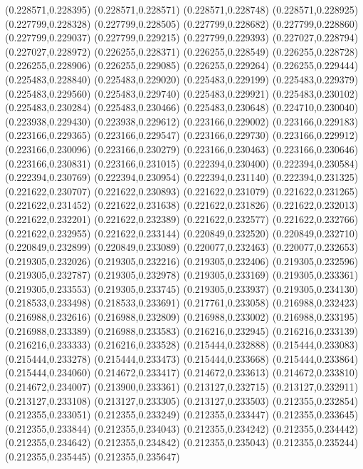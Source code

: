 (0.228571,0.228395)
(0.228571,0.228571)
(0.228571,0.228748)
(0.228571,0.228925)
(0.227799,0.228328)
(0.227799,0.228505)
(0.227799,0.228682)
(0.227799,0.228860)
(0.227799,0.229037)
(0.227799,0.229215)
(0.227799,0.229393)
(0.227027,0.228794)
(0.227027,0.228972)
(0.226255,0.228371)
(0.226255,0.228549)
(0.226255,0.228728)
(0.226255,0.228906)
(0.226255,0.229085)
(0.226255,0.229264)
(0.226255,0.229444)
(0.225483,0.228840)
(0.225483,0.229020)
(0.225483,0.229199)
(0.225483,0.229379)
(0.225483,0.229560)
(0.225483,0.229740)
(0.225483,0.229921)
(0.225483,0.230102)
(0.225483,0.230284)
(0.225483,0.230466)
(0.225483,0.230648)
(0.224710,0.230040)
(0.223938,0.229430)
(0.223938,0.229612)
(0.223166,0.229002)
(0.223166,0.229183)
(0.223166,0.229365)
(0.223166,0.229547)
(0.223166,0.229730)
(0.223166,0.229912)
(0.223166,0.230096)
(0.223166,0.230279)
(0.223166,0.230463)
(0.223166,0.230646)
(0.223166,0.230831)
(0.223166,0.231015)
(0.222394,0.230400)
(0.222394,0.230584)
(0.222394,0.230769)
(0.222394,0.230954)
(0.222394,0.231140)
(0.222394,0.231325)
(0.221622,0.230707)
(0.221622,0.230893)
(0.221622,0.231079)
(0.221622,0.231265)
(0.221622,0.231452)
(0.221622,0.231638)
(0.221622,0.231826)
(0.221622,0.232013)
(0.221622,0.232201)
(0.221622,0.232389)
(0.221622,0.232577)
(0.221622,0.232766)
(0.221622,0.232955)
(0.221622,0.233144)
(0.220849,0.232520)
(0.220849,0.232710)
(0.220849,0.232899)
(0.220849,0.233089)
(0.220077,0.232463)
(0.220077,0.232653)
(0.219305,0.232026)
(0.219305,0.232216)
(0.219305,0.232406)
(0.219305,0.232596)
(0.219305,0.232787)
(0.219305,0.232978)
(0.219305,0.233169)
(0.219305,0.233361)
(0.219305,0.233553)
(0.219305,0.233745)
(0.219305,0.233937)
(0.219305,0.234130)
(0.218533,0.233498)
(0.218533,0.233691)
(0.217761,0.233058)
(0.216988,0.232423)
(0.216988,0.232616)
(0.216988,0.232809)
(0.216988,0.233002)
(0.216988,0.233195)
(0.216988,0.233389)
(0.216988,0.233583)
(0.216216,0.232945)
(0.216216,0.233139)
(0.216216,0.233333)
(0.216216,0.233528)
(0.215444,0.232888)
(0.215444,0.233083)
(0.215444,0.233278)
(0.215444,0.233473)
(0.215444,0.233668)
(0.215444,0.233864)
(0.215444,0.234060)
(0.214672,0.233417)
(0.214672,0.233613)
(0.214672,0.233810)
(0.214672,0.234007)
(0.213900,0.233361)
(0.213127,0.232715)
(0.213127,0.232911)
(0.213127,0.233108)
(0.213127,0.233305)
(0.213127,0.233503)
(0.212355,0.232854)
(0.212355,0.233051)
(0.212355,0.233249)
(0.212355,0.233447)
(0.212355,0.233645)
(0.212355,0.233844)
(0.212355,0.234043)
(0.212355,0.234242)
(0.212355,0.234442)
(0.212355,0.234642)
(0.212355,0.234842)
(0.212355,0.235043)
(0.212355,0.235244)
(0.212355,0.235445)
(0.212355,0.235647)
